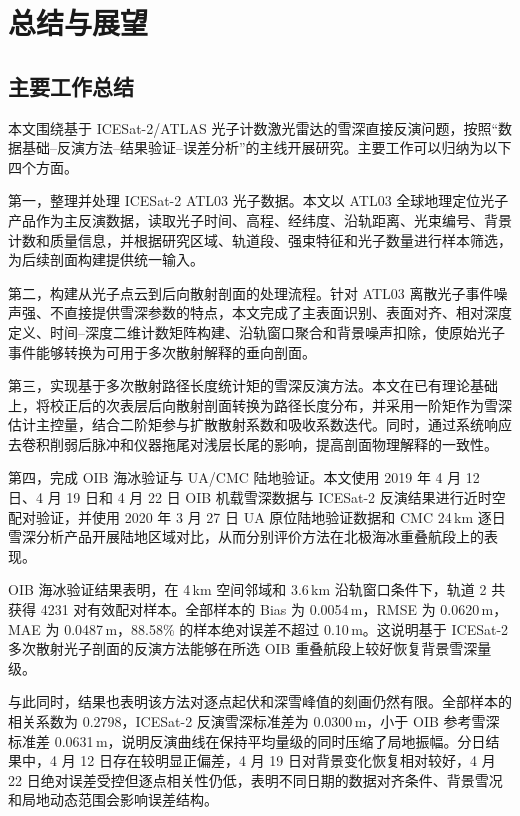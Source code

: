 \cleardoublepage

\section{总结与展望}

\subsection{主要工作总结}
本文围绕基于 ICESat-2/ATLAS 光子计数激光雷达的雪深直接反演问题，按照``数据基础--反演方法--结果验证--误差分析''的主线开展研究。主要工作可以归纳为以下四个方面。

第一，整理并处理 ICESat-2 ATL03 光子数据。本文以 ATL03 全球地理定位光子产品作为主反演数据，读取光子时间、高程、经纬度、沿轨距离、光束编号、背景计数和质量信息，并根据研究区域、轨道段、强束特征和光子数量进行样本筛选，为后续剖面构建提供统一输入。

第二，构建从光子点云到后向散射剖面的处理流程。针对 ATL03 离散光子事件噪声强、不直接提供雪深参数的特点，本文完成了主表面识别、表面对齐、相对深度定义、时间--深度二维计数矩阵构建、沿轨窗口聚合和背景噪声扣除，使原始光子事件能够转换为可用于多次散射解释的垂向剖面。

第三，实现基于多次散射路径长度统计矩的雪深反演方法。本文在已有理论基础上，将校正后的次表层后向散射剖面转换为路径长度分布，并采用一阶矩作为雪深估计主控量，结合二阶矩参与扩散散射系数和吸收系数迭代。同时，通过系统响应去卷积削弱后脉冲和仪器拖尾对浅层长尾的影响，提高剖面物理解释的一致性。

第四，完成 OIB 海冰验证与 UA/CMC 陆地验证。本文使用 2019 年 4 月 12 日、4 月 19 日和 4 月 22 日 OIB 机载雪深数据与 ICESat-2 反演结果进行近时空配对验证，并使用 2020 年 3 月 27 日 UA 原位陆地验证数据和 CMC 24\,km 逐日雪深分析产品开展陆地区域对比，从而分别评价方法在北极海冰重叠航段上的表现。

OIB 海冰验证结果表明，在 4\,km 空间邻域和 3.6\,km 沿轨窗口条件下，轨道 2 共获得 4231 对有效配对样本。全部样本的 Bias 为 0.0054\,m，RMSE 为 0.0620\,m，MAE 为 0.0487\,m，88.58\% 的样本绝对误差不超过 0.10\,m。这说明基于 ICESat-2 多次散射光子剖面的反演方法能够在所选 OIB 重叠航段上较好恢复背景雪深量级。

与此同时，结果也表明该方法对逐点起伏和深雪峰值的刻画仍然有限。全部样本的相关系数为 0.2798，ICESat-2 反演雪深标准差为 0.0300\,m，小于 OIB 参考雪深标准差 0.0631\,m，说明反演曲线在保持平均量级的同时压缩了局地振幅。分日结果中，4 月 12 日存在较明显正偏差，4 月 19 日对背景变化恢复相对较好，4 月 22 日绝对误差受控但逐点相关性仍低，表明不同日期的数据对齐条件、背景雪况和局地动态范围会影响误差结构。


